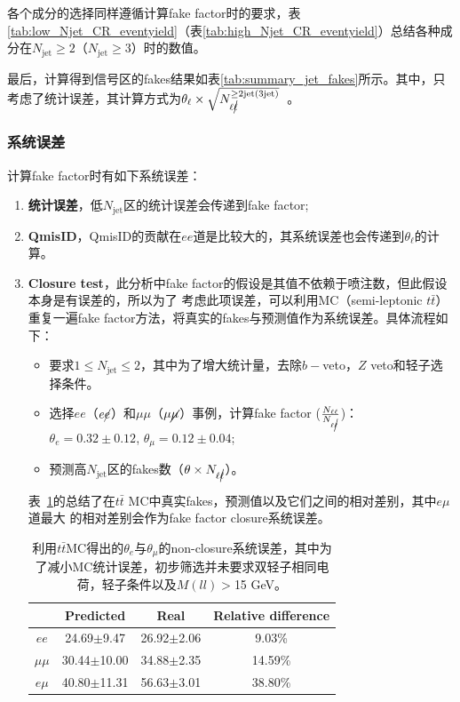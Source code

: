各个成分的选择同样遵循计算fake factor时的要求，表\ref{tab:low_Njet_CR_eventyield}（表\ref{tab:high_Njet_CR_eventyield}）总结各种成分在$N_{\text{jet}}\ge2$（$N_{\text{jet}}\ge3$）时的数值。


最后，计算得到信号区的fakes结果如表\ref{tab:summary_jet_fakes}所示。其中，只考虑了统计误差，其计算方式为$\theta_{\ell}\times \sqrt{N_{\ell\cancel{\ell}}^{\geq \text{2jet(3jet)}}}$~\cite{Alison2015}。


\subsubsection{系统误差}
计算fake factor时有如下系统误差：
\begin{enumerate}
  \item \textbf{统计误差}，低$N_{\text{jet}}$区的统计误差会传递到fake factor;
  \item \textbf{QmisID}，QmisID的贡献在$ee$道是比较大的，其系统误差也会传递到$\theta_{\ell}$的计算。
  \item \textbf{Closure test}，此分析中fake factor的假设是其值不依赖于喷注数，但此假设本身是有误差的，所以为了
考虑此项误差，可以利用MC（semi-leptonic $t\bar{t}$）重复一遍fake factor方法，将真实的fakes与预测值作为系统误差。具体流程如下：
  \begin{itemize}
   \item 要求$1\leq N_{\text{jet}}\leq2$，其中为了增大统计量，去除$b-$veto，$Z$ veto和轻子\pt 选择条件。
   \item 选择$ee$（$e\cancel{e}$）和$\mu\mu$（$\mu\cancel{\mu}$）事例，计算fake factor ($\frac{N_{\ell\ell}}{N_{\ell\cancel{\ell}}}$)：\\
   $\theta_{e}=0.32\pm0.12$, $\theta_{\mu}=0.12\pm0.04$;
   \item 预测高$N_{\text{jet}}$区的fakes数（$\theta \times N_{\ell\cancel{\ell}}$）。
  \end{itemize}
表~\ref{tab:nonclosure_ttbar}的总结了在$t\bar{t}$ MC中真实fakes，预测值以及它们之间的相对差别，其中$e\mu$道最大
的相对差别会作为fake factor closure系统误差。
\begin{table}[h]
\centering
\begin{tabular}{c|ccc}
   &Predicted  &Real   &Relative difference  \\
\hline
$ee$   &24.69$\pm$9.47  &26.92$\pm$2.06 &9.03\% \\
$\mu\mu$ &30.44$\pm$10.00 &34.88$\pm$2.35 &14.59\% \\
$e\mu$   &40.80$\pm$11.31  &56.63$\pm$3.01  &38.80\% \\
\hline
\end{tabular}
\caption{利用$t\bar{t}$MC得出的$\theta_{e}$与$\theta_{\mu}$的non-closure系统误差，其中为了减小MC统计误差，初步筛选并未要求双轻子相同电荷，轻子\pt 条件以及$M(ll)>$15 GeV。}
\label{tab:nonclosure_ttbar}
\end{table}


\end{enumerate}
